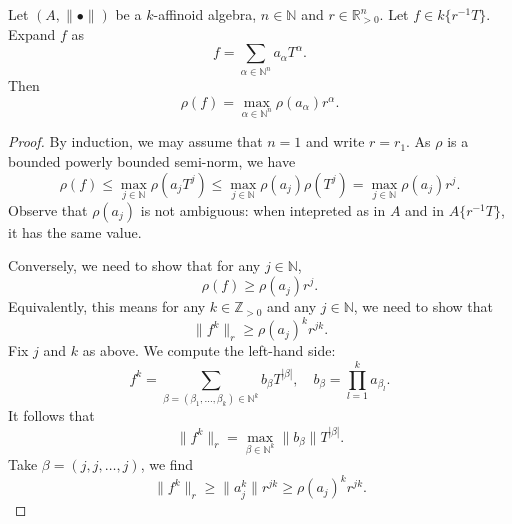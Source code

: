 \begin{lemma}\label{lma-rhointatering}
    Let $(A,\|\bullet\|)$ be a $k$-affinoid algebra, $n\in \mathbb{N}$ and $r\in \mathbb{R}^n_{>0}$. Let $f\in k\{r^{-1}T\}$. Expand $f$ as
    \[
        f=\sum_{\alpha\in \mathbb{N}^n}a_{\alpha}T^{\alpha}.  
    \]
    Then 
    \[
        \rho(f)=\max_{\alpha\in \mathbb{N}^n} \rho(a_{\alpha})r^{\alpha}.
    \]
\end{lemma}
\begin{proof}
    By induction, we may assume that $n=1$ and write $r=r_1$. As $\rho$ is a bounded powerly bounded semi-norm, we have
    \[
        \rho(f)\leq \max_{j\in \mathbb{N}}\rho(a_{j}T^j) \leq \max_{j\in \mathbb{N}}\rho(a_{j})\rho(T^j)= \max_{j\in \mathbb{N}} \rho(a_j)r^j.  
    \]
    Observe that $\rho(a_j)$ is not ambiguous: when intepreted as in $A$ and in $A\{r^{-1}T\}$, it has the same value.

    Conversely, we need to show that for any $j\in \mathbb{N}$, 
    \[
        \rho(f)\geq \rho(a_j)r^j.  
    \]
    Equivalently, this means for any $k\in \mathbb{Z}_{>0}$ and any $j\in \mathbb{N}$, we need to show that
    \[
        \|f^k\|_r\geq \rho(a_j)^k r^{jk}.  
    \]
    Fix $j$ and $k$ as above.
    We compute the left-hand side:
    \[
        f^k=\sum_{\beta=(\beta_1,\ldots,\beta_k)\in \mathbb{N}^k} b_{\beta} T^{|\beta|},\quad b_{\beta}=\prod_{l=1}^k a_{\beta_l}.  
    \]
    It follows that
    \[
        \|f^k\|_r=\max_{\beta \in \mathbb{N}^k} \|b_{\beta}\|T^{|\beta|}.
    \]
    Take $\beta=(j,j,\ldots,j)$, we find
    \[
        \|f^k\|_r\geq \|a_j^k\| r^{jk}\geq \rho(a_j)^k r^{jk}.
    \]
\end{proof}

